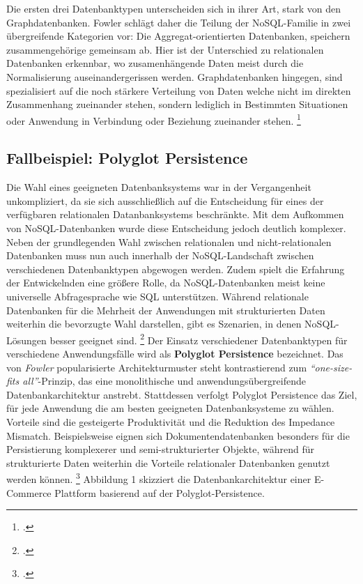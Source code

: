 Die ersten drei Datenbanktypen unterscheiden sich in ihrer Art, stark von den Graphdatenbanken. Fowler schlägt daher die Teilung der NoSQL-Familie  in zwei übergreifende Kategorien vor: Die Aggregat-orientierten Datenbanken, speichern zusammengehörige gemeinsam ab. Hier ist der Unterschied zu relationalen Datenbanken erkennbar, wo zusamenhängende Daten meist durch die Normalisierung auseinandergerissen werden. Graphdatenbanken hingegen, sind spezialisiert auf die noch stärkere Verteilung von Daten welche nicht im direkten Zusammenhang zueinander stehen, sondern lediglich in Bestimmten Situationen oder Anwendung in Verbindung oder Beziehung zueinander stehen. \footcite{fowlerAggregateOrientedDatabase2012}

\subsection{Fallbeispiel: Polyglot Persistence}

Die Wahl eines geeigneten Datenbanksystems war in der Vergangenheit unkompliziert, da sie sich ausschließlich auf die Entscheidung für eines der verfügbaren relationalen Datanbanksystems beschränkte. Mit dem Aufkommen von NoSQL-Datenbanken wurde diese Entscheidung jedoch deutlich komplexer. Neben der grundlegenden Wahl zwischen relationalen und nicht-relationalen Datenbanken muss nun auch innerhalb der NoSQL-Landschaft zwischen verschiedenen Datenbanktypen abgewogen werden. Zudem spielt die Erfahrung der Entwickelnden eine größere Rolle, da NoSQL-Datenbanken meist keine universelle Abfragesprache wie SQL unterstützen. Während relationale Datenbanken für die Mehrheit der Anwendungen mit strukturierten Daten weiterhin die bevorzugte Wahl darstellen, gibt es Szenarien, in denen NoSQL-Lösungen besser geeignet sind. \footcite[S. 194]{harrisonNextGenerationDatabases2015} Der Einsatz verschiedener Datenbanktypen für verschiedene Anwendungsfälle wird als \textbf{Polyglot Persistence} bezeichnet. Das von \textit{Fowler} popularisierte Architekturmuster steht kontrastierend zum \textit{\enquote{one-size-fits all}}-Prinzip, das eine monolithische und anwendungsübergreifende Datenbankarchitektur anstrebt. Stattdessen verfolgt Polyglot Persistence das Ziel, für jede Anwendung die am besten geeigneten Datenbanksysteme zu wählen. Vorteile sind die gesteigerte Produktivität und die Reduktion des Impedance Mismatch. Beispielsweise eignen sich Dokumentendatenbanken besonders für die Persistierung komplexerer und semi-strukturierter Objekte, während für strukturierte Daten weiterhin die Vorteile relationaler Datenbanken genutzt werden können. \footcite[S. 1 f.]{gessertPolyglotPersistence2015} Abbildung 1 skizziert die Datenbankarchitektur einer E-Commerce Plattform basierend auf der Polyglot-Persistence.

